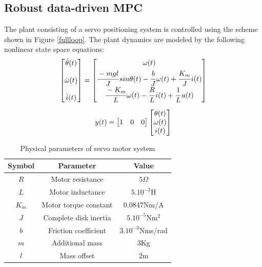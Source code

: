 \documentclass[letterpaper, 10 pt, conference]{ieeeconf}  %
\begin{document}
	\subsection{Robust data-driven MPC }
	The plant consisting of a servo positioning system is controlled using the scheme shown in Figure \ref{fullloop}. The plant dynamics are modeled by the following nonlinear state space equations:
	\begin{equation*}
	\small
	\begin{matrix}
	\begin{bmatrix}
	\dot{\theta}(t) \vspace{12pt} \\
	\dot{\omega}(t) \vspace{12pt} \\
	\dot{i}(t)
	\end{bmatrix} = 
	\begin{bmatrix}
	\omega(t) \vspace{3pt}\\
	\cfrac{-mgl}{J}\hspace{1pt}sin\theta(t)-\cfrac{b}{J}\hspace{1pt}\omega(t) + \cfrac{K_m}{J}\hspace{1pt}i(t) \\  
	\cfrac{-K_m}{L}\hspace{1pt}\omega(t)-\cfrac{R}{L}\hspace{1pt}i(t) + \cfrac{1}{L}\hspace{1pt}u(t)
	\end{bmatrix} \vspace{10pt}\\
	y(t) = \begin{bmatrix} 1 & 0 & 0 \end{bmatrix} 
	\begin{bmatrix} \theta(t) \\ \omega(t) \\ i(t) \end{bmatrix} 
	\end{matrix}
	\end{equation*}
	\begin{table}[h!]
		\hspace{30pt}
		\begin{tabular}{||c|c|c||} 
			\hline
			Symbol & Parameter & Value\\ [0.5ex] 
			\hline\hline
			$R$ & Motor resistance & $5\Omega$ \\ 
			$L$ & Motor inductance & $5.10^{-3}$H \\
			$K_m$ & Motor torque constant & $0.0847$Nm/A \\
			$J$ & Complete disk inertia & $5.10^{-5}$Nm$^2$ \\
			$b$ & Friction coefficient & $3.10^{-3}$Nms/rad \\
			$m$ & Additional mass & $3$Kg \\
			$l$ & Mass offset & $2$m \\
			\hline
		\end{tabular}
		\caption{Physical parameters of servo motor system}
		\label{Simparam}
		\vspace{-10pt}  
	\end{table}
\end{document}

